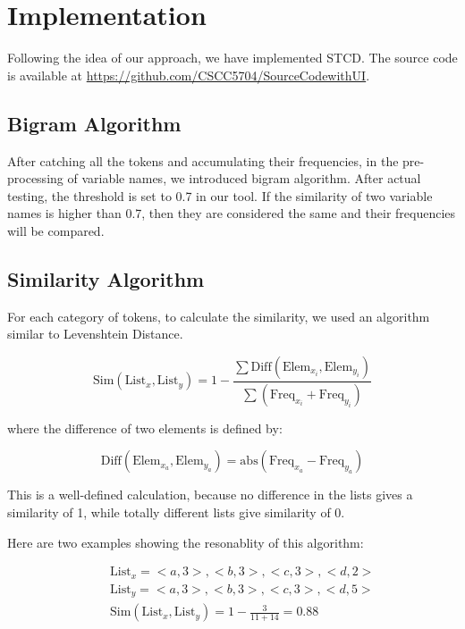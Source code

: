 \documentclass[../main.tex]{subfiles}
\begin{document}
\section{Implementation}

Following the idea of our approach, we have implemented STCD. The source code is available at {\color{blue} \url{https://github.com/CSCC5704/SourceCodewithUI}}.

\subsection{Bigram Algorithm}

After catching all the tokens and accumulating their frequencies, in the pre-processing of variable names, we introduced bigram algorithm\cite{bigram}. After actual testing, the threshold is set to 0.7 in our tool. If the similarity of two variable names is higher than 0.7, then they are considered the same and their frequencies will be compared.

\subsection{Similarity Algorithm}

For each category of tokens, to calculate the similarity, we used an algorithm similar to Levenshtein Distance\cite{LD}.

\begin{equation}
\text{Sim}(\text{List}_x, \text{List}_y) = 1 - \frac{\sum \text{Diff}(\text{Elem}_{x_i}, \text{Elem}_{y_i})} {\sum (\text{Freq}_{x_i} + \text{Freq}_{y_i} )}
\end{equation}

where the difference of two elements is defined by:

\begin{equation}
\text{Diff}(\text{Elem}_{x_a}, \text{Elem}_{y_a}) = \text{abs}(\text{Freq}_{x_a} - \text{Freq}_{y_a})
\end{equation}

This is a well-defined calculation, because no difference in the lists gives a similarity of 1, while totally different lists give similarity of 0.

Here are two examples showing the resonablity of this algorithm:

\begin{eqnarray}\nonumber
&&\text{List}_x = {<a, 3>, <b, 3>, <c, 3>, <d, 2>}\\ \nonumber
&&\text{List}_y = {<a, 3>, <b, 3>, <c, 3>, <d, 5>} \\ 
&&\text{Sim}(\text{List}_x, \text{List}_y) = 1 - \frac{3}{11 + 14} = 0.88
\end{eqnarray}
\end{document}
